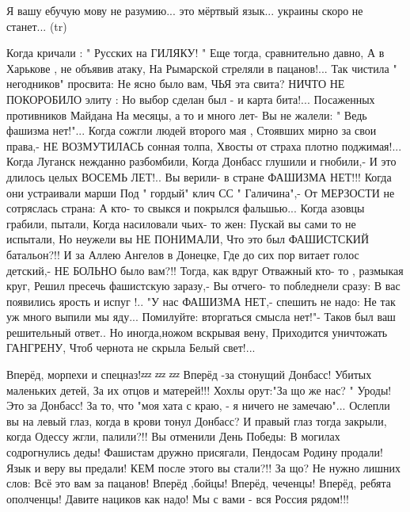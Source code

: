 Я вашу ебучую мову не разумию... это мёртвый язык... украины скоро не станет...
(tr)

Когда кричали : " Русских на ГИЛЯКУ! "
Еще тогда, сравнительно давно,
А в Харькове , не объявив атаку,
На Рымарской стреляли в пацанов!...
Так чистила " негодников" просвита:
Не ясно было вам, ЧЬЯ эта свита?
НИЧТО НЕ ПОКОРОБИЛО элиту :
Но выбор сделан был - и карта бита!...
Посаженных противников Майдана
На месяцы, а то и много лет-
Вы не жалели:
" Ведь фашизма нет!"...
Когда сожгли людей второго мая ,
Стоявших мирно за свои права,-
НЕ ВОЗМУТИЛАСЬ сонная толпа,
Хвосты от страха плотно поджимая!...
Когда Луганск нежданно разбомбили,
Когда Донбасс глушили и гнобили,-
И это длилось целых ВОСЕМЬ ЛЕТ!..
Вы верили- в стране ФАШИЗМА НЕТ!!!
Когда они устраивали марши
Под " гордый" клич СС " Галичина",-
От МЕРЗОСТИ не сотряслась страна:
А кто- то свыкся и покрылся фальшью...
Когда азовцы грабили, пытали,
Когда насиловали чьих- то жен:
Пускай вы сами то не испытали,
Но неужели вы НЕ ПОНИМАЛИ,
Что это был ФАШИСТСКИЙ батальон?!!
И за Аллею Ангелов в Донецке,
Где до сих пор витает голос детский,-
НЕ БОЛЬНО было вам?!! Тогда, как вдруг
Отважный кто- то , размыкая круг,
Решил пресечь фашистскую заразу,-
Вы отчего- то побледнели сразу:
В вас появились ярость и испуг !..
"У нас ФАШИЗМА НЕТ,- спешить не надо:
Не так уж много выпили мы яду...
Помилуйте: вторгаться смысла нет!"-
Таков был ваш решительный ответ..
Но иногда,ножом вскрывая вену,
Приходится уничтожать ГАНГРЕНУ,
Чтоб чернота не скрыла
Белый свет!...

Вперёд, морпехи и спецназ!💤 💤 💤
Вперёд -за стонущий Донбасс!
Убитых маленьких детей,
За их отцов и матерей!!!
Хохлы орут:"За що же нас? "
Уроды! Это за Донбасс!
За то, что "моя хата с краю, -
я ничего не замечаю"...
Ослепли вы на левый глаз,
когда в крови тонул Донбасс?
И правый глаз тогда закрыли,
когда Одессу жгли, палили?!!
Вы отменили День Победы:
В могилах содрогнулись деды!
Фашистам дружно присягали,
Пендосам Родину продали!
Язык и веру вы предали!
КЕМ после этого вы стали?!!
За що? Не нужно лишних слов:
Всё это вам за пацанов!
Вперёд ,бойцы! Вперёд, чеченцы!
Вперёд, ребята ополченцы!
Давите нациков как надо!
Мы с вами - вся Россия рядом!!!

